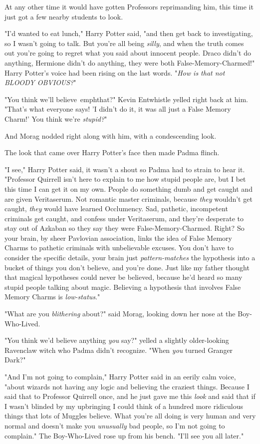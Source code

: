 At any other time it would have gotten Professors reprimanding him, this time 
it just got a few nearby students to look.

"I'd wanted to eat lunch," Harry Potter said, "and then get back to 
investigating, so I wasn't going to talk. But you're all being \emph{silly}, 
and when the truth comes out you're going to regret what you said about 
innocent people. Draco didn't do anything, Hermione didn't do anything, they 
were both False-Memory-Charmed!" Harry Potter's voice had been rising on the 
last words. "\emph{How is that not BLOODY OBVIOUS?}"

"You think we'll believe\ emph{that?}" Kevin Entwhistle yelled right back at 
him. "That's what everyone says! 'I didn't do it, it was all just a False 
Memory Charm!' You think we're \emph{stupid?}"

And Morag nodded right along with him, with a condescending look.

The look that came over Harry Potter's face then made Padma flinch.

"I see," Harry Potter said, it wasn't a shout so Padma had to strain to hear 
it. "Professor Quirrell isn't here to explain to me how stupid people are, but 
I bet this time I can get it on my own. People do something dumb and get caught 
and are given Veritaserum. Not romantic master criminals, because \emph{they} 
wouldn't get caught, \emph{they} would have learned Occlumency. Sad, pathetic, 
incompetent criminals get caught, and confess under Veritaserum, and they're 
desperate to stay out of Azkaban so they say they were False-Memory-Charmed. 
Right? So your brain, by sheer Pavlovian association, links the idea of False 
Memory Charms to pathetic criminals with unbelievable excuses. You don't have 
to consider the specific details, your brain just \emph{pattern-matches} the 
hypothesis into a bucket of things you don't believe, and you're done. Just 
like my father thought that magical hypotheses could never be believed, because 
he'd heard so many stupid people talking about magic. Believing a hypothesis 
that involves False Memory Charms is \emph{low-status}."

"What are you \emph{blithering} about?" said Morag, looking down her nose at 
the Boy-Who-Lived.

"You think we'd believe anything \emph{you} say?" yelled a slightly 
older-looking Ravenclaw witch who Padma didn't recognize. "When \emph{you} 
turned Granger Dark?"

"And I'm not going to complain," Harry Potter said in an eerily calm voice, 
"about wizards not having any logic and believing the craziest things. Because 
I said that to Professor Quirrell once, and he just gave me this \emph{look} 
and said that if I wasn't blinded by my upbringing I could think of a hundred 
more ridiculous things that lots of Muggles believe. What you're all doing is 
very human and very normal and doesn't make you \emph{unusually} bad people, so 
I'm not going to complain." The Boy-Who-Lived rose up from his bench. "I'll see 
you all later."

